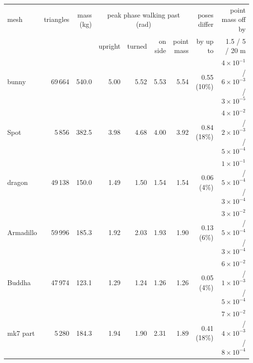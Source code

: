 \begin{tabular}{lrrrrrrrr}
\toprule
mesh & triangles & mass (kg) & \multicolumn{4}{c}{peak phase walking past (rad)} & poses differ & point mass off by \\
\cmidrule(lr){4-7}
 & & & upright & turned & on side & point mass & by up to & 1.5 / 5 / 20 m \\
\midrule
bunny & 69\,664 & 540.0 & 5.00 & 5.52 & 5.53 & 5.54 & 0.55 (10\%) & $4\times10^{-1}$ / $6\times10^{-3}$ / $3\times10^{-5}$ \\
Spot & 5\,856 & 382.5 & 3.98 & 4.68 & 4.00 & 3.92 & 0.84 (18\%) & $4\times10^{-2}$ / $2\times10^{-3}$ / $5\times10^{-4}$ \\
dragon & 49\,138 & 150.0 & 1.49 & 1.50 & 1.54 & 1.54 & 0.06 (4\%) & $1\times10^{-1}$ / $5\times10^{-4}$ / $3\times10^{-4}$ \\
Armadillo & 59\,996 & 185.3 & 1.92 & 2.03 & 1.93 & 1.90 & 0.13 (6\%) & $3\times10^{-2}$ / $5\times10^{-4}$ / $3\times10^{-4}$ \\
Buddha & 47\,974 & 123.1 & 1.29 & 1.24 & 1.26 & 1.26 & 0.05 (4\%) & $6\times10^{-2}$ / $1\times10^{-3}$ / $5\times10^{-4}$ \\
mk7 part & 5\,280 & 184.3 & 1.94 & 1.90 & 2.31 & 1.89 & 0.41 (18\%) & $7\times10^{-2}$ / $4\times10^{-3}$ / $8\times10^{-4}$ \\
\bottomrule
\end{tabular}
